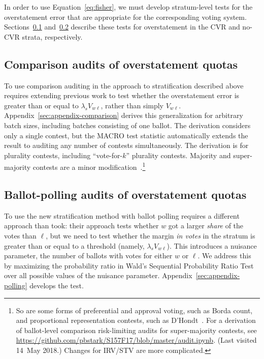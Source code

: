 \documentclass[runningheads]{llncs}
\begin{document}
In order to use Equation~\ref{eq:fisher}, we must develop stratum-level tests for the overstatement error that are appropriate for the corresponding voting system.
Sections~\ref{sec:comparisonError} and~\ref{sec:ballotPollError} describe these tests for overstatement in the CVR and no-CVR strata, respectively.

\subsection{Comparison audits of overstatement quotas}
\label{sec:comparisonError}

To use comparison auditing in the approach to stratification described above requires extending previous work to test whether the overstatement error is greater than or equal to $\lambda_s V_{w\ell}$, rather than simply $V_{w\ell}$.
Appendix~\ref{sec:appendix-comparison} derives this generalization for arbitrary batch sizes, including batches consisting of one ballot.
The derivation considers only a single contest, but the 
MACRO test statistic \cite{stark09c,stark10d} automatically extends the result to 
auditing any number of contests simultaneously.
The derivation is for plurality contests, including ``vote-for-$k$'' plurality contests.
Majority and super-majority contests are a minor 
modification~\cite{stark08a}.\footnote{%
  So are some forms of preferential and approval voting, such as Borda count, and
  proportional representation contests, such as D'Hondt~\cite{starkTeague14}.
  For a derivation of ballot-level comparison risk-limiting audits for super-majority contests, 
  see \url{https://github.com/pbstark/S157F17/blob/master/audit.ipynb}. (Last visited 14~May 2018.)
  Changes for IRV/STV are more complicated.
}

\subsection{Ballot-polling audits of overstatement quotas}
\label{sec:ballotPollError}

To use the new stratification method with ballot polling requires a different approach than \cite{lindemanEtal12} took: their approach tests whether $w$ got a larger \emph{share} of the votes than $\ell$, but we need to test whether the margin \emph{in votes} in the stratum is greater than or equal to a threshold (namely, $\lambda_s V_{w\ell}$).
This introduces a nuisance parameter, the number of ballots with votes for either $w$ or $\ell$.
We address this by maximizing the probability ratio in Wald's Sequential Probability Ratio Test 
\cite{wald45} over all possible values of the nuisance parameter.
Appendix~\ref{sec:appendix-polling} develops the test.
\end{document}
